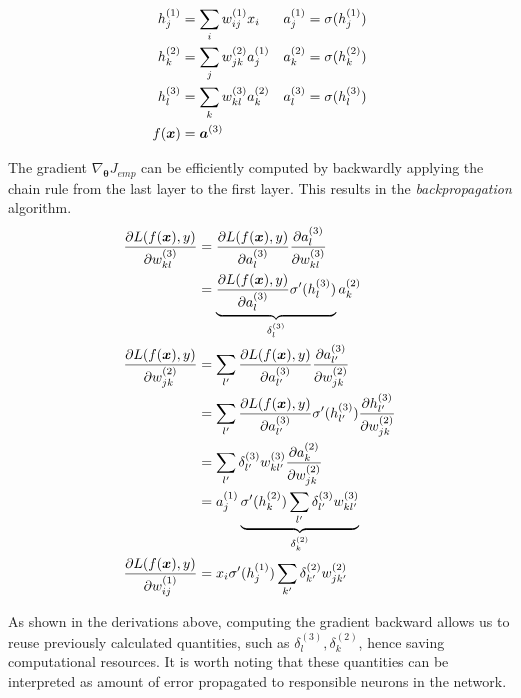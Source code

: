 \begin{align*}
		h_j^{(1)} &= \sum_i w_{ij}^{(1)} x_i & a_j^{(1)} &= \sigma (h_j^{(1)})	\\
		h_k^{(2)} &= \sum_j w_{jk}^{(2)} a_j^{(1)}  & a_k^{(2)} &= \sigma (h_k^{(2)})	 \\
		h_l^{(3)} &= \sum_k w_{kl}^{(3)} a_k^{(2)} & a_l^{(3)} &= \sigma (h_l^{(3)})	 \\
		f(\boldsymbol{x}) &= \boldsymbol{a}^{(3)}
\end{align*}

The gradient $\nabla_{\boldsymbol{\theta}} J_{emp}$ can be efficiently computed by backwardly applying the chain rule from the last layer to the first layer. This results in the \textit{backpropagation} algorithm.
\begin{align*}
	\frac{\partial L(f(\boldsymbol{x}), y)  }{\partial w_{k  l}^{(3)} } &= 	\frac{\partial L(f(\boldsymbol{x}), y) }{\partial a_{l}^{(3)} }  \frac{\partial a_{l}^{(3)} }{\partial w_{k  l}^{(3)} }  	\\
		&= 	\underbrace{\frac{\partial L(f(\boldsymbol{x}), y) }{\partial a_{l}^{(3)} } \sigma'(h_l^{(3)})}_{ \delta_l^{(3)}} a_{k}^{(2)} 	\\
	\frac{\partial L(f(\boldsymbol{x}), y)  }{\partial w_{j  k}^{(2)} } 
		&=  \sum_{l'} 	\frac{\partial L(f(\boldsymbol{x}), y) }{\partial a_{l'}^{(3)} } \frac{\partial a_{l'}^{(3)}}{\partial w_{j  k}^{(2)}} \\
		&= \sum_{l'} 	\frac{\partial L(f(\boldsymbol{x}), y) }{\partial a_{l'}^{(3)} } \sigma'(h_{l'}^{(3)})  \frac{\partial h_{l'}^{(3)} }{\partial w_{j  k}^{(2)}} \\
		&= \sum_{l'} 	\delta_{l'}^{(3)}  w_{k  l'}^{(3)} \frac{\partial a_{k}^{(2)} }{\partial w_{j  k}^{(2)}} \\
		&= a_{j}^{(1)}  \underbrace{\sigma'(h_{k}^{(2)}) \sum_{l'}\delta_{l'}^{(3)} w_{k  l'}^{(3)}}_{\delta_{k}^{(2)}}  \\
	\frac{\partial L(f(\boldsymbol{x}), y)  }{\partial w_{i  j}^{(1)} } &=  x_i  \sigma'(h_{j}^{(1)}) \sum_{k'} 	\delta_{k'}^{(2)} w_{j  k'}^{(2)} 
\end{align*}

As shown in the derivations above, computing the gradient backward allows us to reuse previously calculated quantities, such as $\delta_l^{(3)}, \delta_{k}^{(2)}$, hence saving computational resources.  It is worth noting that these  quantities can be interpreted as amount of error propagated to responsible neurons in the network.

%

